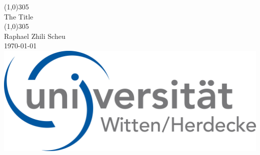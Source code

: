 \begin{frame}
\centering
\vspace{4em}
\line(1,0){305}\\
\vspace{0.9em}
{\Large The Title}\\
\line(1,0){305}\\
\vspace{1.5em}
{\small Raphael Zhili Scheu}\\
\vspace{1em}
{\scriptsize \today}\\
\vspace{2.5em}
\centering
\includegraphics[width=.2\linewidth]{Pics/Dekoration/UWH Logo.png}
\end{frame}